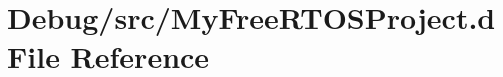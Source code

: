 \hypertarget{MyFreeRTOSProject_8d}{}\section{Debug/src/\+My\+Free\+R\+T\+O\+S\+Project.d File Reference}
\label{MyFreeRTOSProject_8d}
